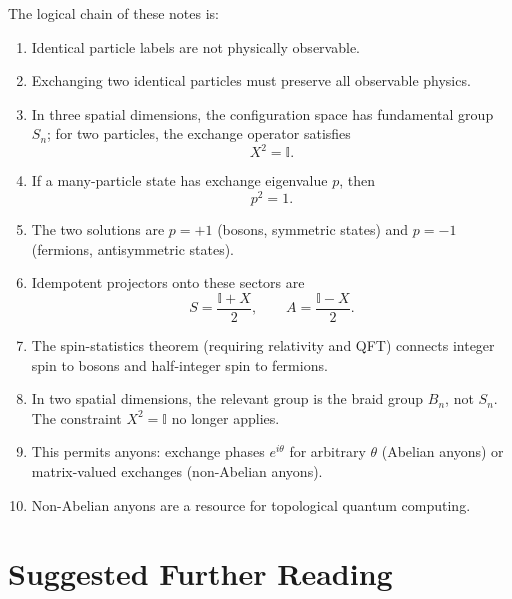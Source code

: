 \documentclass[11pt,a4paper]{article}
\newcommand{\id}{\mathbb{I}}
\begin{document}
The logical chain of these notes is:
\begin{enumerate}
  \item Identical particle labels are not physically observable.
  \item Exchanging two identical particles must preserve all observable physics.
  \item In three spatial dimensions, the configuration space has fundamental
        group $S_n$; for two particles, the exchange operator satisfies
        \[
          X^2 = \id.
        \]
  \item If a many-particle state has exchange eigenvalue $p$, then
        \[
          p^2 = 1.
        \]
  \item The two solutions are $p = +1$ (bosons, symmetric states) and
        $p = -1$ (fermions, antisymmetric states).
  \item Idempotent projectors onto these sectors are
        \[
          S = \frac{\id + X}{2}, \qquad A = \frac{\id - X}{2}.
        \]
  \item The spin-statistics theorem (requiring relativity and QFT) connects
        integer spin to bosons and half-integer spin to fermions.
  \item In two spatial dimensions, the relevant group is the braid group $B_n$,
        not $S_n$.  The constraint $X^2 = \id$ no longer applies.
  \item This permits anyons: exchange phases $e^{i\theta}$ for arbitrary
        $\theta$ (Abelian anyons) or matrix-valued exchanges (non-Abelian anyons).
  \item Non-Abelian anyons are a resource for topological quantum computing.
\end{enumerate}

\section{Suggested Further Reading}
\end{document}
